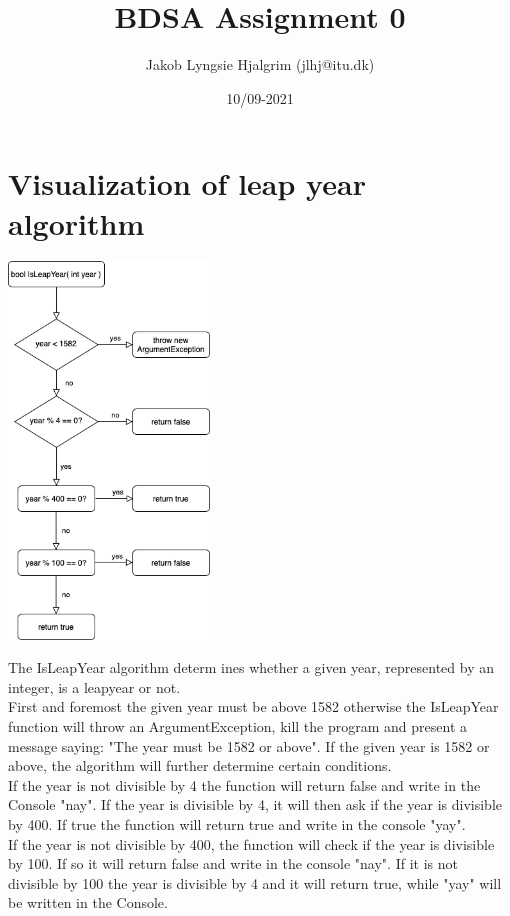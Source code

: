 \documentclass{article}
\title{BDSA Assignment 0}
\author{Jakob Lyngsie Hjalgrim (jlhj@itu.dk)}
\date{10/09-2021}
\begin{document}
\maketitle

\section{Visualization of leap year algorithm}
\begin{center}
\includegraphics[width=0.4\textwidth]{leapyear_flowchart.png}
\end{center}

The IsLeapYear algorithm determ ines whether a given year, represented by an integer,
is a leapyear or not. \\
First and foremost the given year must be above 1582 otherwise the IsLeapYear function will throw an ArgumentException, kill the program and present a message saying: "The year must be 1582 or above". If the given year is 1582 or above, the algorithm will further determine certain conditions. \\
If the year is not divisible by 4 the function will return false and write in the Console "nay". If the year is divisible by 4, it will then ask if the year is divisible by 400. If true the function will return true and write in the console "yay".\\
If the year is not divisible by 400, the function will check if the year is divisible by 100. If so it will return false and write in the console "nay". If it is not divisible by 100 the year is divisible by 4 and it will return true, while "yay" will be written in the Console.
\end{document}
